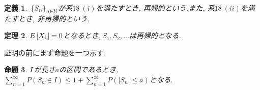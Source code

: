 \documentclass{jsarticle}
\newtheorem{thm}{定理}
\newtheorem{dfn}[thm]{定義}
\newtheorem{prop}[thm]{命題}
\begin{document}
\begin{dfn}
$\\ \displaystyle \left\{ S_{n} \right\}_{n \in \mathbb{N}}$が系$18 \ (i)$を満たすとき, 再帰的という.また, 系$18 \ (ii)$を満たすとき, 非再帰的という.
\end{dfn}

\begin{thm}
$\displaystyle \\ E\left[ X_{1} \right] = 0$となるとき,$\displaystyle \ S_{1}, S_{2}, \dots$は再帰的となる.
\end{thm}

証明の前にまず命題を一つ示す.
\begin{prop}
$\displaystyle \\ I$が長さ$a$の区間であるとき, 
$\displaystyle \sum_{n=1}^{\infty} P \left(S_{n} \in I \right) \le 1 + \sum_{n=1}^{\infty} P \left( \left| S_{n} \right| \le a  \right)$となる.
\end{prop}
\end{document}
